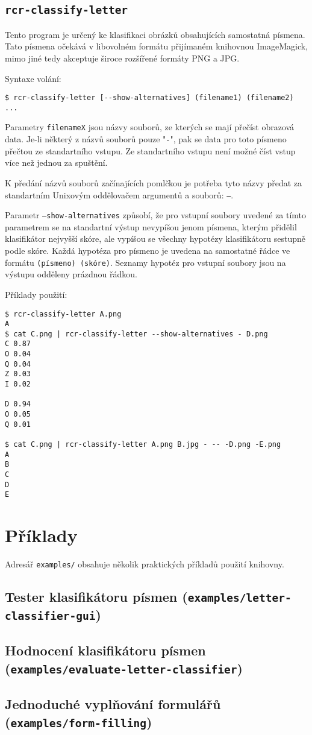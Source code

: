 \documentclass[a4paper]{article}
\begin{document}
\subsection{\texttt{rcr-classify-letter}}
Tento program je určený ke klasifikaci obrázků obsahujících samostatná písmena.
Tato písmena očekává v libovolném formátu přijímaném knihovnou ImageMagick,
mimo jiné tedy akceptuje široce rozšířené formáty PNG a JPG.

Syntaxe volání:
\begin{lstlisting}
$ rcr-classify-letter [--show-alternatives] (filename1) (filename2) ...
\end{lstlisting}

Parametry \texttt{filenameX} jsou názvy souborů, ze kterých se mají přečíst
obrazová data. Je-li některý z názvů souborů pouze "\texttt{-}", pak se data
pro toto písmeno přečtou ze standartního vstupu. Ze standartního vstupu
není možné číst vstup více než jednou za spuštění.

K předání názvů souborů začínajících pomlčkou je potřeba tyto názvy předat
za standartním Unixovým oddělovačem argumentů a souborů: \texttt{--}.

Parametr \texttt{--show-alternatives} způsobí, že pro vstupní soubory
uvedené za tímto parametrem se na standartní výstup nevypíšou jenom
písmena, kterým přidělil klasifikátor nejvyšší skóre, ale vypíšou se
všechny hypotézy klasifikátoru sestupně podle skóre. Každá hypotéza
pro písmeno je uvedena na samostatné řádce ve formátu \texttt{(písmeno)
(skóre)}. Seznamy hypotéz pro vstupní soubory jsou na výstupu odděleny prázdnou
řádkou.

Příklady použití:
\begin{lstlisting}
$ rcr-classify-letter A.png
A
$ cat C.png | rcr-classify-letter --show-alternatives - D.png
C 0.87
O 0.04
Q 0.04
Z 0.03
I 0.02

D 0.94
O 0.05
Q 0.01

$ cat C.png | rcr-classify-letter A.png B.jpg - -- -D.png -E.png
A
B
C
D
E
\end{lstlisting}

\section{Příklady}
Adresář \texttt{examples/} obsahuje několik praktických příkladů použití knihovny.

\subsection{Tester klasifikátoru písmen (\texttt{examples/letter-classifier-gui})}

\subsection{Hodnocení klasifikátoru písmen (\texttt{examples/evaluate-letter-classifier})}

\subsection{Jednoduché vyplňování formulářů (\texttt{examples/form-filling})}
\end{document}
